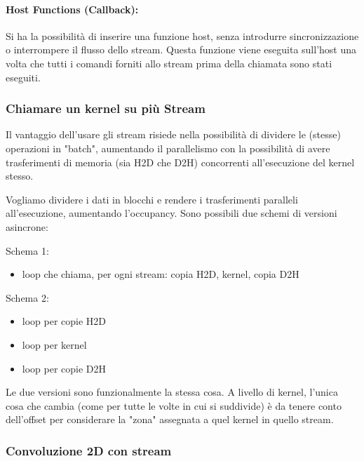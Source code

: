 \paragraph{Host Functions (Callback):} Si ha la possibilità di inserire una funzione host, senza introdurre sincronizzazione o interrompere il flusso dello stream. Questa funzione viene eseguita sull'host una volta che tutti i comandi forniti allo stream prima della chiamata sono stati eseguiti.

\subsubsection{Chiamare un kernel su più Stream}

Il vantaggio dell'usare gli stream risiede nella possibilità di dividere le (stesse) operazioni in "batch", aumentando il parallelismo con la possibilità di avere trasferimenti di memoria (sia H2D che D2H) concorrenti all'esecuzione del kernel stesso. 

Vogliamo dividere i dati in blocchi e rendere i trasferimenti paralleli all'esecuzione, aumentando l'occupancy. Sono possibili due schemi di versioni asincrone: 

\begin{minipage}{.48\linewidth}
	Schema 1: 
	\begin{itemize}
		\item loop che chiama, per ogni stream: copia H2D, kernel, copia D2H
	\end{itemize}
\end{minipage}
\hfill 
\begin{minipage}{.48\linewidth}
	Schema 2:
	\begin{itemize}
		\item loop per copie H2D
		
		\item loop per kernel
		
		\item loop per copie D2H
	\end{itemize} 
\end{minipage}

Le due versioni sono funzionalmente la stessa cosa. A livello di kernel, l'unica cosa che cambia (come per tutte le volte in cui si suddivide) è da tenere conto dell'offset per considerare la "zona" assegnata a quel kernel in quello stream.

\subsubsection{Convoluzione 2D con stream}


